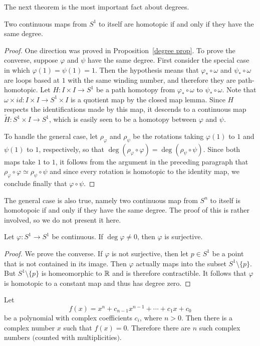 The next theorem is the most important fact about degrees.
\begin{theorem}
Two continuous maps from $S^1$ to itself are homotopic if and only if they have the same degree.
\end{theorem}
\begin{proof}
One direction was proved in Proposition~\ref{degree prop}. To prove the converse, suppose $\varphi$ and $\psi$ have the same degree. First consider the special case in which $\varphi(1)=\psi(1)=1$. Then the hypothesis means that $\varphi_*\circ\omega$ and $\psi_*\circ\omega$ are loops based at $1$ with the same winding number, and therefore they are path-homotopic. Let $H:I\times I\to S^1$ be a path homotopy from $\varphi_*\circ\omega$ to $\psi_*\circ\omega$. Note that $\omega\times id:I\times I\to S^1\times I$ is a quotient map by the closed map lemma. Since $H$ respects the identifications made by this map, it descends to a continuous map $\widetilde{H}:S^1\times I\to S^1$, which is easily seen to be a homotopy between $\varphi$ and $\psi$.\par
To handle the general case, let $\rho_\varphi$ and $\rho_\psi$ be the rotations taking $\varphi(1)$ to $1$ and $\psi(1)$ to $1$, respectively, so that $\deg(\rho_\varphi\circ\varphi)=\deg(\rho_\psi\circ\psi)$. Since both maps take $1$ to $1$, it follows from the argument in the preceding paragraph that $\rho_\varphi\circ\varphi\simeq\rho_\psi\circ\psi$ and since every rotation is homotopic to the identity map, we conclude finally that $\varphi\circ\psi$.
\end{proof}
\begin{remark}
The general case is also true, namely two continuous map from $S^n$ to itself is homotopoic if and only if they have the same degree. The proof of this is rather involved, so 
we do not present it here.
\end{remark}
\begin{theorem}
Let $\varphi:S^1\to S^1$ be continuous. If $\deg\varphi\neq 0$, then $\varphi$ is surjective.
\end{theorem}
\begin{proof}
We prove the converse. If $\varphi$ is not surjective, then let $p\in S^1$ be a point that is not contained in its image. Then $\varphi$ actually maps into
the subset $S^1\setminus\{p\}$. But $S^1\setminus\{p\}$ is homeomorphic to $\mathbb{R}$ and is therefore contractible. It follows that $\varphi$ is homotopic to a constant map and thus has degree zero.
\end{proof}
\begin{theorem}\label{fund theo algebra}
Let
\[f(x)=x^n+c_{n-1}x^{n-1}+\cdots+c_1x+c_0\]
be a polynomial with complex coefficients $c_i$, where $n>0$. Then there is a complex number $x$ such that $f(x)=0$. Therefore there are $n$ such complex numbers $($counted with multiplicities$)$.
\end{theorem}
